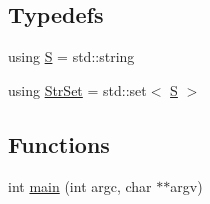 \subsection*{Typedefs}
\begin{DoxyCompactItemize}
\item 
using \hyperlink{_formal_language_theory-_complex_2_main_8cpp_a51c40915539205f0b5add30b0d68a4cb}{S} = std\+::string
\item 
using \hyperlink{_formal_language_theory-_complex_2_main_8cpp_a809d982ed20fa378f251596c3b5ad6b7}{Str\+Set} = std\+::set$<$ \hyperlink{_formal_language_theory-_complex_2_main_8cpp_a51c40915539205f0b5add30b0d68a4cb}{S} $>$
\end{DoxyCompactItemize}
\subsection*{Functions}
\begin{DoxyCompactItemize}
\item 
int \hyperlink{_formal_language_theory-_complex_2_main_8cpp_a3c04138a5bfe5d72780bb7e82a18e627}{main} (int argc, char $\ast$$\ast$argv)
\end{DoxyCompactItemize}
